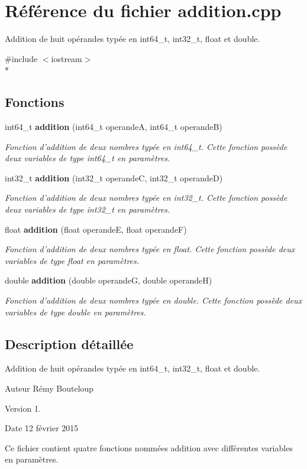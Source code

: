 \section{Référence du fichier addition.\-cpp}
\label{addition_8cpp}


Addition de huit opérandes typée en int64\-\_\-t, int32\-\_\-t, float et double.  


{\ttfamily \#include $<$iostream$>$}\\*
\subsection*{Fonctions}
\begin{DoxyCompactItemize}
\item 
int64\-\_\-t {\bf addition} (int64\-\_\-t operande\-A, int64\-\_\-t operande\-B)
\begin{DoxyCompactList}\small\item\em Fonction d'addition de deux nombres typée en int64\-\_\-t. Cette fonction possède deux variables de type int64\-\_\-t en paramètres. \end{DoxyCompactList}\item 
int32\-\_\-t {\bf addition} (int32\-\_\-t operande\-C, int32\-\_\-t operande\-D)
\begin{DoxyCompactList}\small\item\em Fonction d'addition de deux nombres typée en int32\-\_\-t. Cette fonction possède deux variables de type int32\-\_\-t en paramètres. \end{DoxyCompactList}\item 
float {\bf addition} (float operande\-E, float operande\-F)
\begin{DoxyCompactList}\small\item\em Fonction d'addition de deux nombres typée en float. Cette fonction possède deux variables de type float en paramètres. \end{DoxyCompactList}\item 
double {\bf addition} (double operande\-G, double operande\-H)
\begin{DoxyCompactList}\small\item\em Fonction d'addition de deux nombres typée en double. Cette fonction possède deux variables de type double en paramètres. \end{DoxyCompactList}\end{DoxyCompactItemize}


\subsection{Description détaillée}
Addition de huit opérandes typée en int64\-\_\-t, int32\-\_\-t, float et double. \begin{DoxyAuthor}{Auteur}
Rémy Bouteloup 
\end{DoxyAuthor}
\begin{DoxyVersion}{Version}
1. 
\end{DoxyVersion}
\begin{DoxyDate}{Date}
12 février 2015
\end{DoxyDate}
Ce fichier contient quatre fonctions nommées addition avec différentes variables en paramètres. 

